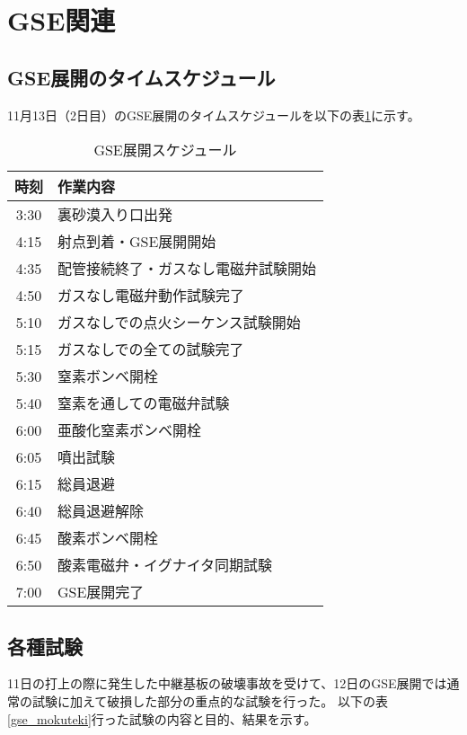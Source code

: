 \documentclass[a4paper,11pt,titlepage,uplatex]{jsarticle}
\begin{document}
\section{GSE関連}

\subsection{GSE展開のタイムスケジュール}
11月13日（2日目）のGSE展開のタイムスケジュールを以下の表\ref{gse_time}に示す。
\begin{table}[H]
    \centering
    \caption{GSE展開スケジュール}
    \begin{tabular}{cl} \toprule
        時刻   & 作業内容               \\ \midrule
        3:30 & 裏砂漠入り口出発           \\
        4:15 & 射点到着・GSE展開開始       \\
        4:35 & 配管接続終了・ガスなし電磁弁試験開始 \\
        4:50 & ガスなし電磁弁動作試験完了      \\
        5:10 & ガスなしでの点火シーケンス試験開始  \\
        5:15 & ガスなしでの全ての試験完了      \\
        5:30 & 窒素ボンベ開栓            \\
        5:40 & 窒素を通しての電磁弁試験       \\
        6:00 & 亜酸化窒素ボンベ開栓         \\
        6:05 & 噴出試験               \\
        6:15 & 総員退避               \\
        6:40 & 総員退避解除             \\
        6:45 & 酸素ボンベ開栓            \\
        6:50 & 酸素電磁弁・イグナイタ同期試験    \\
        7:00 & GSE展開完了            \\
        \bottomrule
    \end{tabular}
    \label{gse_time}
\end{table}

\subsection{各種試験}
11日の打上の際に発生した中継基板の破壊事故を受けて、12日のGSE展開では通常の試験に加えて破損した部分の重点的な試験を行った。
以下の表\ref{gse_mokuteki}行った試験の内容と目的、結果を示す。
\end{document}
